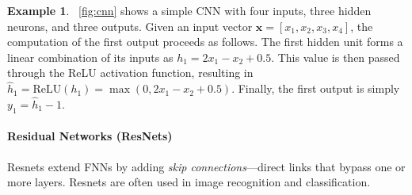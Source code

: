 \documentclass[oneside,11pt,dvipsnames]{book}
\numberwithin{equation}{section}
\theoremstyle{definition}
\newtheorem{example}{Example}[section]
\theoremstyle{remark}
\begin{document}
\begin{example}
   ~\autoref{fig:cnn} shows a simple CNN with four inputs, three hidden neurons, and three outputs. %
Given an input vector $\mathbf{x} = [x_1, x_2, x_3, x_4]$, the computation of the first output proceeds as follows. 
The first hidden unit forms a linear combination of its inputs as $h_1 = 2x_1 - x_2 + 0.5$. 
This value is then passed through the ReLU activation function, resulting in $\hat{h}_1 = \mathrm{ReLU}(h_1) = \max(0, 2x_1 - x_2 + 0.5)$. 
Finally, the first output is simply $y_1 = \hat{h}_1 - 1$.


\end{example}

\paragraph{Residual Networks (ResNets)} Resnets extend FNNs by adding \emph{skip connections}—direct links that bypass one or more layers. Resnets are often used in image recognition and classification. 
\end{document}

